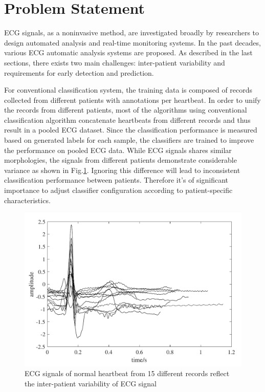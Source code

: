 
\section{Problem Statement}

ECG signals, as a noninvasive method, are investigated broadly by researchers to design automated analysis and real-time monitoring systems. In the past decades, various ECG automatic analysis systems are proposed. As described in the last sections, there exists two main challenges: inter-patient variability and requirements for early detection and prediction. %

For conventional classification system, the training data is composed of records collected from different patients with annotations per heartbeat. In order to unify the records from different patients, most of the algorithms using conventional classification algorithm concatenate heartbeats from different records and thus result in a pooled ECG dataset. Since the classification performance is measured based on generated labels for each sample, the classifiers are trained to improve the performance on pooled ECG data. While ECG signals shares similar morphologies, the signals from different patients demonstrate considerable variance as shown in Fig.\ref{fig:interpatient_variability}. Ignoring this difference will lead to inconsistent classification performance between patients. Therefore it's of significant importance to adjust classifier configuration according to patient-specific characteristics.  %

 \begin{figure}[thpb]
 	\centering
 	\includegraphics[scale=0.7]{Fig/interpatient_variability.pdf}
 	\caption{ECG signals of normal heartbeat from 15 different records reflect the inter-patient variability of ECG signal}
 	\label{fig:interpatient_variability}
 \end{figure}

